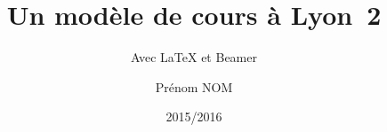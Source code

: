 \title{Un modèle de cours à Lyon~2}
\subtitle{Avec \LaTeX{} et Beamer}
\author{Prénom NOM}
\date{2015/2016}
